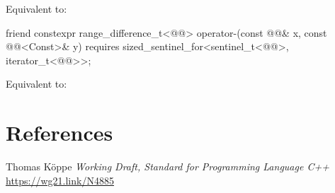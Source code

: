 \documentclass{wg21}
\begin{document}
\begin{addedblock}
\begin{itemdescr}
    \pnum
    \effects
    Equivalent to: 
\end{itemdescr}

\begin{itemdecl}
    friend constexpr range_difference_t<@@>
    operator-(const @@& x, const @@<Const>& y)
    requires sized_sentinel_for<sentinel_t<@@>, iterator_t<@@>>;
\end{itemdecl}

\begin{itemdescr}
    \pnum
    \effects
    Equivalent to: 
\end{itemdescr}

\end{addedblock}


\section{References}
\renewcommand{\section}[2]{}%



\begin{thebibliography}{9}

Thomas Köppe
\emph{Working Draft, Standard for Programming Language C++}\newline
\url{https://wg21.link/N4885}


\end{thebibliography}
\end{document}
